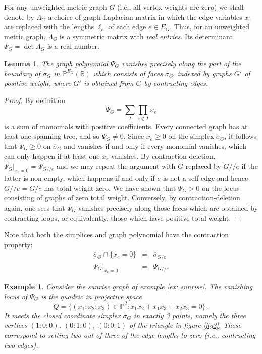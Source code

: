 \documentclass[12pt]{amsart}
\newcommand{\PP}{{\mathbb P}}
\newcommand{\RR}{{\mathbb R}}
\theoremstyle{plain}
\newtheorem{lem}[thm]{Lemma}
\newtheorem{ex}[thm]{Example}
\newcommand{\q}{/\!\!/}
\newcommand{\0}{\color{blue}{\mathsf{0}}}
\begin{document}
For any  unweighted metric graph $G$   (i.e., all vertex weights are zero) we shall denote by $\Lambda_G$ a choice of graph Laplacian matrix in which the edge variables $x_e$ are replaced with the lengths $\ell_e$ of each edge $e\in E_G$. Thus, for an unweighted metric graph, $\Lambda_G$ is a symmetric matrix with \emph{real entries}. Its determinant $\Psi_G= \det \Lambda_G$ is a real number.    

\begin{lem} The graph polynomial  $\Psi_G$  vanishes precisely along the part of the boundary of $\overline{\sigma}_G$  in 
  $\PP^{E_G}(\RR)$ which consists of  faces  $\overline{\sigma}_{G'}$   indexed by graphs   $G'$ of positive weight, where $G'$ is  obtained from $G$ by contracting edges.
\end{lem} 

\begin{proof} By definition 
\[ \Psi_G = \sum_T \prod_{e\notin T} x_e\]
 is a sum of monomials  with positive coefficients.  Every connected graph has at least one spanning tree, and so $\Psi_G\neq 0$. Since $x_e\geq 0$ on the simplex $\overline{\sigma}_G$, it follows that $\Psi_G\geq0$ on $\overline{\sigma}_G$ and vanishes if and only if every monomial vanishes, which can only happen if at least one $x_e$ vanishes.  By contraction-deletion,  $\Psi_G\big|_{x_e=0} = \Psi_{G\q e}$ and we may repeat the argument with $G$ replaced by $G\q e$ if the latter is non-empty, which happens if and only if $e$ is not a self-edge and hence $G\q e= G/e$ has  total weight zero.  We have shown that $\Psi_G>0$ on the locus consisting of graphs of zero total weight.   Conversely, by contraction-deletion again, one sees that $\Psi_G$ vanishes precisely along those faces which  are obtained by  contracting loops, or equivalently, those  which have positive total weight. 
\end{proof} 


Note that both the simplices and graph polynomial have the contraction property:
\begin{eqnarray}
\overline{\sigma}_G \cap \{x_e=0\}  & = &  \overline{\sigma}_{G/e}  \nonumber \\
 \Psi_G \Big|_{x_e=0}  & = &  \Psi_{G\q e}  \nonumber
\end{eqnarray} 
\begin{ex} Consider the  sunrise graph of example \ref{ex: sunrise}.  The vanishing locus of $\Psi_G$ is  the quadric in projective space 
\[Q=\{ (x_1:x_2:x_3) \in \PP^2  :  x_1x_2+x_1x_3+x_2x_3=0\} \ . \]
It meets the closed coordinate simplex $\overline{\sigma}_G$ in exactly 3 points, namely the three vertices $(1:0:0)$, $(0:1:0)$, $(0:0:1)$  of the triangle in figure \ref{fig3}. These  correspond to setting two out of three of the edge lengths to zero (i.e., contracting two edges). 
\end{ex}
\end{document}

